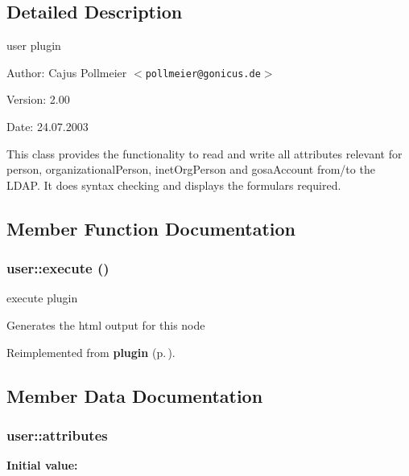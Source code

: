 \subsection{Detailed Description}
user plugin 

\begin{Desc}
\item[Author:]Cajus Pollmeier $<${\tt pollmeier@gonicus.de}$>$ \end{Desc}
\begin{Desc}
\item[Version:]2.00 \end{Desc}
\begin{Desc}
\item[Date:]24.07.2003\end{Desc}
This class provides the functionality to read and write all attributes relevant for person, organizational\-Person, inet\-Org\-Person and gosa\-Account from/to the LDAP. It does syntax checking and displays the formulars required. 



\subsection{Member Function Documentation}
\subsubsection{\setlength{\rightskip}{0pt plus 5cm}user::execute ()}\label{classuser_a1}


execute plugin 

Generates the html output for this node 

Reimplemented from {\bf plugin} {\rm (p.\,\pageref{classplugin_a1})}.

\subsection{Member Data Documentation}
\subsubsection{\setlength{\rightskip}{0pt plus 5cm}user::attributes}\label{classuser_o48}


{\bf Initial value:}

